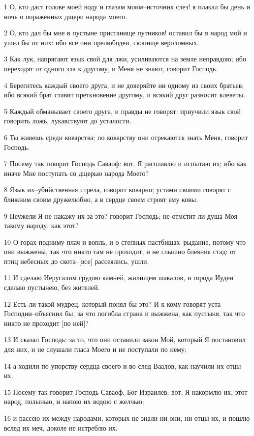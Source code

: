 \par 1 О, кто даст голове моей воду и глазам моим--источник слез! я плакал бы день и ночь о пораженных дщери народа моего.
\par 2 О, кто дал бы мне в пустыне пристанище путников! оставил бы я народ мой и ушел бы от них: ибо все они прелюбодеи, скопище вероломных.
\par 3 Как лук, напрягают язык свой для лжи, усиливаются на земле неправдою; ибо переходят от одного зла к другому, и Меня не знают, говорит Господь.
\par 4 Берегитесь каждый своего друга, и не доверяйте ни одному из своих братьев; ибо всякий брат ставит преткновение другому, и всякий друг разносит клеветы.
\par 5 Каждый обманывает своего друга, и правды не говорят: приучили язык свой говорить ложь, лукавствуют до усталости.
\par 6 Ты живешь среди коварства; по коварству они отрекаются знать Меня, говорит Господь.
\par 7 Посему так говорит Господь Саваоф: вот, Я расплавлю и испытаю их; ибо как иначе Мне поступать со дщерью народа Моего?
\par 8 Язык их--убийственная стрела, говорит коварно; устами своими говорят с ближним своим дружелюбно, а в сердце своем строят ему ковы.
\par 9 Неужели Я не накажу их за это? говорит Господь; не отмстит ли душа Моя такому народу, как этот?
\par 10 О горах подниму плач и вопль, и о степных пастбищах--рыдание, потому что они выжжены, так что никто там не проходит, и не слышно блеяния стад: от птиц небесных до скота--[все] рассеялись, ушли.
\par 11 И сделаю Иерусалим грудою камней, жилищем шакалов, и города Иудеи сделаю пустынею, без жителей.
\par 12 Есть ли такой мудрец, который понял бы это? И к кому говорят уста Господни--объяснил бы, за что погибла страна и выжжена, как пустыня, так что никто не проходит [по ней]?
\par 13 И сказал Господь: за то, что они оставили закон Мой, который Я постановил для них, и не слушали гласа Моего и не поступали по нему;
\par 14 а ходили по упорству сердца своего и во след Ваалов, как научили их отцы их.
\par 15 Посему так говорит Господь Саваоф, Бог Израилев: вот, Я накормлю их, этот народ, полынью, и напою их водою с желчью;
\par 16 и рассею их между народами, которых не знали ни они, ни отцы их, и пошлю вслед их меч, доколе не истреблю их.
